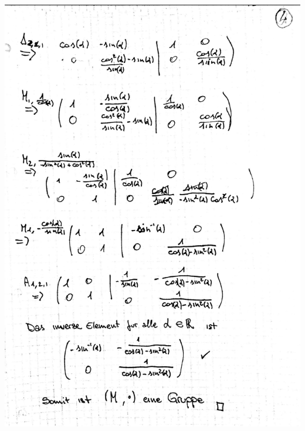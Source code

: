 \documentclass[12pt,a4paper]{article}
\begin{document}
\newpage
\includegraphics[scale=0.2]{lat4e_4.jpg} 
\newpage
\end{document}

